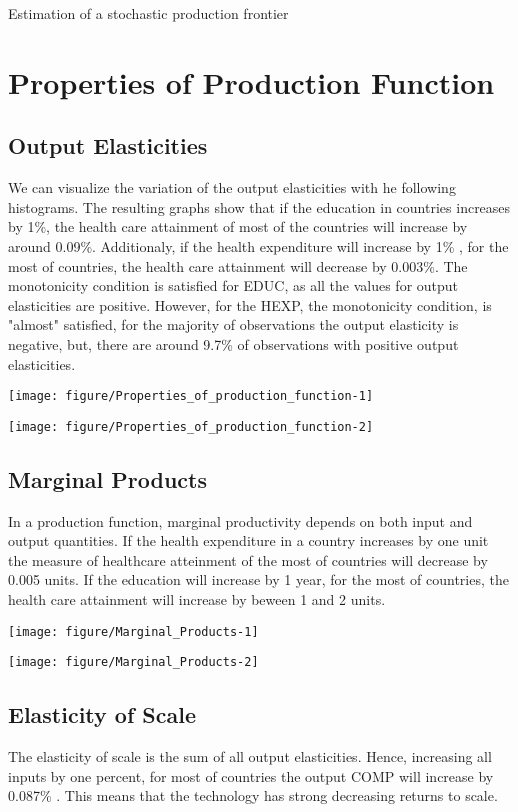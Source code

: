 \documentclass[12pt,a4paper]{article}\usepackage[]{graphicx}\usepackage[]{color}
\makeatletter
\def\maxwidth{ %
  \ifdim\Gin@nat@width>\linewidth
    \linewidth
  \else
    \Gin@nat@width
  \fi
}
\makeatother
\begin{document}
Estimation of a stochastic production frontier

\section{Properties of Production Function}

\subsection{Output Elasticities}

We can visualize the variation of the output elasticities with he following histograms. The resulting graphs show that if the education in countries increases 
 by 1\%, the health care attainment of most of the countries 
will increase by around 0.09\%. Additionaly, if the health expenditure will increase by 1\% , for the most of  
countries, the health care attainment will decrease by 0.003\%.
The monotonicity condition is satisfied for EDUC, as all the values for output elasticities
are positive.
However, for the HEXP, the monotonicity condition, is "almost" satisfied, 
for the majority of observations the output elasticity is negative, but, there are
around 9.7\% of observations with positive output elasticities. 

\texttt{[image: figure/Properties\_of\_production\_function-1]} 

\texttt{[image: figure/Properties\_of\_production\_function-2]} 

\subsection{Marginal Products}
In a production function, marginal productivity depends on both input and output 
quantities.
If the health expenditure in a country increases  by one unit 
the measure of healthcare atteinment of the most of countries 
will decrease by 0.005 units.
If the education will increase by 1 year, for the most of  countries, the 
health care attainment will increase by beween 1 and 2 units.


\texttt{[image: figure/Marginal\_Products-1]} 

\texttt{[image: figure/Marginal\_Products-2]} 


\subsection{Elasticity of Scale}
The elasticity of scale is the sum of all output elasticities. Hence, increasing all  inputs by one percent, for most of countries
the output COMP will increase by 0.087\% .
This means that the technology has strong decreasing returns to scale.
\end{document}
